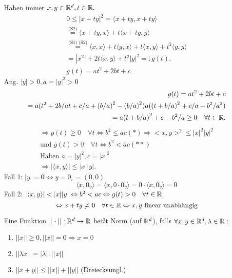 \documentclass[../ana1.tex]{subfiles}
\begin{document}
\begin{bew}
	Haben immer \( x,y\in\mathbb{R}^d, t\in\mathbb{R}. \)
	\begin{align*}
		0\leq |x+ty|^2 = \langle x+ty, x+ty\rangle \\
		\overset{\text{(S2)}}{=} \langle x+ty,x\rangle + t\langle x+ty,y\rangle \\
		\overset{\text{(S1) (S2)}}{=} \langle x,x\rangle + t \langle y,x\rangle + t\langle x,y\rangle + t^2\langle y,y\rangle \\
		= |x^2| + 2t\langle x,y\rangle + t^2|y|^2 =: g(t).\\
		g(t) = at^2 + 2bt + c
	\end{align*}
	Ang. \(|y| > 0, a = |y|^2 > 0 \)
	\begin{align*}
		g(t) = at^2 + 2bt + c\\
		= a{(t^2 + 2b/a t + c/a + {(b/a)}^2 - {(b/a)}^2)} a{({(t+b/a)}^2 + c/a - b^2/a^2)}\\
		= a{(t+b/a)}^2 + c - b^2/a \geq 0 \quad\forall t\in\mathbb{R}.
	\end{align*}
	\begin{align*}
		\Rightarrow g(t) \geq 0 \quad\forall t \Leftrightarrow b^2 \leq ac (*) \Rightarrow <x,y>^2 \leq |x|^2|y|^2\\
		\text{und }g(t) > 0 \quad\forall t \Leftrightarrow b^2 < ac (**)\\
		\text{Haben }  a=|y|^2, c=|x|^2\\
		\Rightarrow |\langle x,y\rangle|\leq |x||y|.
	\end{align*}
	Fall 1: \(|y| = 0 \Leftrightarrow y = 0_v = (0, 0)\)
	\[\langle x, 0_v\rangle = \langle x, 0 \cdot 0_v\rangle = 0 \cdot \langle x, 0_v\rangle = 0\]
	Fall 2: \(|\langle x, y\rangle| < |x||y| \Leftrightarrow b^2 < ac \Leftrightarrow g(t) > 0 \quad \forall t \in \mathbb{R} \) \\
	\[\Leftrightarrow x + ty \neq 0 \quad \forall t \in \mathbb{R} \Leftrightarrow x, y \text{ linear unabhängig} \]
\end{bew}
\begin{defi}
	Eine Funktion \( ||\cdot || : \mathbb{R}^d \rightarrow \mathbb{R} \) heißt Norm (auf \( \mathbb{R}^d \)), falls \( \forall x,y\in\mathbb{R}^d, \lambda\in\mathbb{R}: \)
	\begin{enumerate}
		\item \( ||x||\geq 0, ||x|| = 0 \Rightarrow x = 0 \)
		\item \( ||\lambda x|| = |\lambda|\cdot||x|| \)
		\item \( ||x+y|| \leq ||x|| + ||y|| \) (Dreiecksungl.)
	\end{enumerate}
\end{defi}
\end{document}
